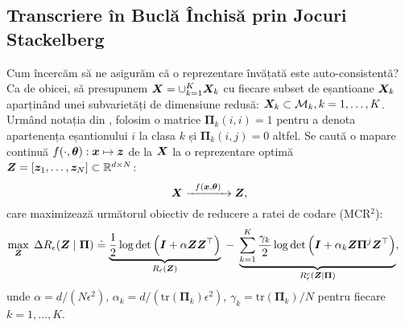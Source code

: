 \documentclass[../../book-main_ro.tex]{subfiles}
\begin{document}
\subsection{Transcriere în Buclă Închisă prin Jocuri Stackelberg}\label{sec:closed-loop-transcription}



Cum încercăm să ne asigurăm că o reprezentare învățată este auto-consistentă? Ca de obicei, să presupunem $\bm{X} = \cup_{k=1}^K \bm{X}_k$ cu fiecare subset de eșantioane $\bm{X}_k$ aparținând unei subvarietăți de dimensiune redusă: $\bm{X}_k \subset \mathcal{M}_k, k = 1,\ldots, K$. Urmând notația din , folosim o matrice $\bm \Pi_k(i,i) = 1$ pentru a denota apartenența eșantionului $i$ la clasa $k$ și $\bm \Pi_k(i,j) = 0$ altfel. Se caută o mapare continuă $f(\cdot,\bm \theta): \bm{x} \mapsto \bm{z}$ de la $\bm{X}$ la o reprezentare optimă $\bm{Z} = [\bm{z}_1, \ldots, \bm{z}_N] \subset \mathbb{R}^{d \times N}$:
\begin{equation}
\bm X  \xrightarrow{\hspace{2mm} f(\bm{x}, \bm \theta) \hspace{2mm}} \bm Z,
\label{eqn:LDR}
\end{equation}
care maximizează următorul obiectiv de reducere a ratei de codare (MCR$^2$):
\begin{equation}\label{eq:mcr2-formulation}
\begin{split}
\max_{\Z} \; \Delta R_\epsilon(\Z  \mid \bm{\Pi}) %
&\doteq \underbrace{\frac{1}{2}\log\det \Big(\I + {\alpha} \Z \Z^\top \Big)}_{R_{\epsilon}(\Z)} \;-\; \underbrace{\sum_{k=1}^{K}\frac{\gamma_k}{2} \log\det\Big(\I + {\alpha_k} \Z \bm{\Pi}^{j} \Z^\top \Big)}_{R^c_{\epsilon}(\Z \mid \bm \Pi)},
\end{split}
\end{equation}
unde $\alpha = {d}/({N\epsilon^2})$, $\alpha_k = d/({\mathrm{tr}(\bm{\Pi}_k)\epsilon^2})$, $\gamma_k =  {\mathrm{tr}(\bm{\Pi}_{k})}/{N}$ pentru fiecare $k = 1,\dots, K$.
\end{document}
